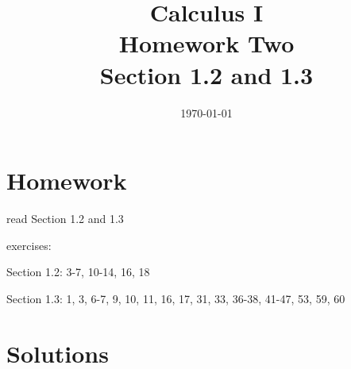 \documentclass[letterpaper, landscape]{exam}
\title{Calculus I \\ Homework Two \\ Section 1.2 and 1.3}
\author{}
\date{\today}
\begin{document}
  \maketitle

  \section{Homework}
    \begin{itemize*}
      \item read Section 1.2 and 1.3
      \item exercises: 
        \begin{itemize*}
          \item Section 1.2: 3-7, 10-14, 16, 18
          \item Section 1.3: 1, 3, 6-7, 9, 10, 11, 16, 17, 31, 33, 36-38, 41-47,
            53, 59, 60
        \end{itemize*}
    \end{itemize*}

  \ifprintanswers

    \section{Solutions}
\end{document}
